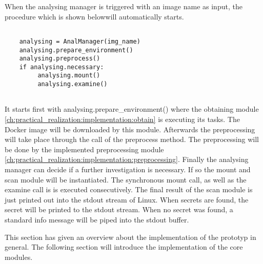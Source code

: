 When the analysing manager is triggered with an image name as input, the procedure which is shown belowwill automatically starts.
\lstset{language=Python}          %
\begin{lstlisting}[]  % Start your code-block
	
    analysing = AnalManager(img_name)
    analysing.prepare_environment()
    analysing.preprocess()
    if analysing.necessary:
         analysing.mount()
         analysing.examine()
    
\end{lstlisting}
It starts first with analysing.prepare\_environment() where the obtaining module \ref{ch:practical_realization:implementation:obtain} is executing its tasks. The Docker image will be downloaded by this module. Afterwards the preprocessing will take place through the call of the preprocess method. The preprocessing will be done by the implemented preprocessing module \ref{ch:practical_realization:implementation:preprocessing}.
Finally the analysing manager can decide if a further investigation is necessary. If so the mount and scan module will be instantiated. The synchronous mount call, as well as the examine call is is executed consecutively. The final result of the scan module is just printed out into the stdout stream of Linux.
When secrets are found, the secret will be printed to the stdout stream. When no secret was found, a standard info message will be piped into the stdout buffer.

This section has given an overview about the implementation of the prototyp in general. The following section will introduce the implementation of the core modules.

